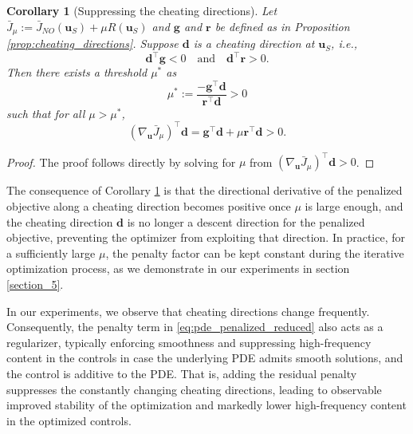 \documentclass[final,1p,times]{elsarticle}
\theoremstyle{plain} %
\newtheorem{corollary}[theorem]{Corollary}
\theoremstyle{definition} %
\theoremstyle{remark} %
\begin{document}
\begin{corollary}[Suppressing the cheating directions]\label{cor:suppress_cheating}
Let $\bar{J}_\mu:=\bar{J}_{NO}(\mathbf{u}_S)+\mu R(\mathbf{u}_S)$ and $\mathbf{g}$ and $\mathbf{r}$ be defined as in Proposition \ref{prop:cheating_directions}. Suppose $\mathbf{d}$ is a cheating direction at $\mathbf{u}_S$, i.e.,
\begin{equation}
\mathbf{d}^\top \mathbf{g}<0 \quad \text{and}\quad \mathbf{d}^\top \mathbf{r}>0.
\end{equation}
Then there exists a threshold $\mu^*$ as
\begin{equation}
\mu^*:=\frac{-\mathbf{g}^\top \mathbf{d}}{\mathbf{r}^\top \mathbf{d}}>0
\end{equation}
such that for all $\mu>\mu^*$,
\begin{equation}
(\nabla_\mathbf{u}\bar{J}_\mu)^\top \mathbf{d}=\mathbf{g}^\top \mathbf{d} + \mu \mathbf{r}^\top \mathbf{d}>0.
\end{equation}
\end{corollary}
\begin{proof}
The proof follows directly by solving for $\mu$ from $(\nabla_\mathbf{u}\bar{J}_\mu)^{\top}\mathbf{d}>0$.
\end{proof}

The consequence of Corollary \ref{cor:suppress_cheating} is that the directional derivative of the penalized objective along a cheating direction becomes positive once $\mu$ is large enough, and the cheating direction $\mathbf{d}$ is no longer a descent direction for the penalized objective, preventing the optimizer from exploiting that direction. In practice, for a sufficiently large $\mu$, the penalty factor can be kept constant during the iterative optimization process, as we demonstrate in our experiments in section \ref{section_5}.

In our experiments, we observe that cheating directions change frequently. Consequently, the penalty term in \eqref{eq:pde_penalized_reduced} also acts as a regularizer, typically enforcing smoothness and suppressing high-frequency content in the controls in case the underlying PDE admits smooth solutions, and the control is additive to the PDE. That is, adding the residual penalty suppresses the constantly changing cheating directions, leading to observable improved stability of the optimization and markedly lower high-frequency content in the optimized controls. 
\end{document}
